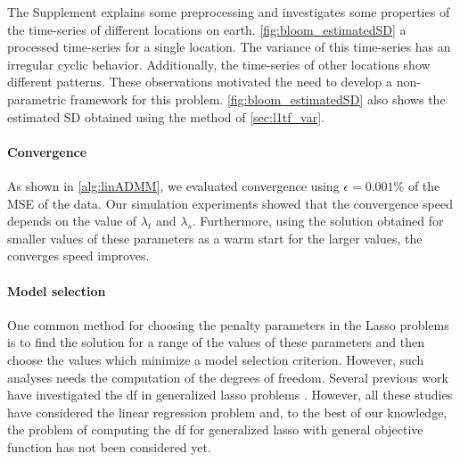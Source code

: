 \documentclass{article}
\begin{document}
The Supplement explains some preprocessing and investigates some
properties of the time-series of different locations on
earth. \autoref{fig:bloom_estimatedSD} a processed time-series for a
single location.
The variance of this time-series has an irregular cyclic
behavior. Additionally, the time-series of other locations show 
different patterns. These observations motivated the need to develop a
non-parametric framework for this
problem. \autoref{fig:bloom_estimatedSD} also shows the
estimated SD obtained using the method of
\autoref{sec:l1tf_var}. 

\paragraph{Convergence}

As shown in \autoref{alg:linADMM}, we evaluated convergence using
$\epsilon=0.001\%$ of the MSE of the data.
Our simulation experiments showed that the
convergence speed depends on the value of $\lambda_t$ and
$\lambda_s$. Furthermore, using the solution obtained for smaller values
of these parameters as a warm start for the larger values, the
converges speed improves.   


\paragraph{Model selection}
One common method for choosing the penalty parameters in the Lasso
problems is to find the solution for a range of the values of these
parameters and then choose the values which minimize a model selection
criterion. However, such analyses needs the computation of the degrees
of freedom. Several previous work have investigated the df in
generalized lasso problems
\citep{tibshirani_degrees_2012,hu_dual_2015,zeng_geometry_2017}. However,
all these studies have considered the linear regression problem and,
to the best of our knowledge, the problem of computing the df for
generalized lasso with general objective function has not been
considered yet.
\end{document}
